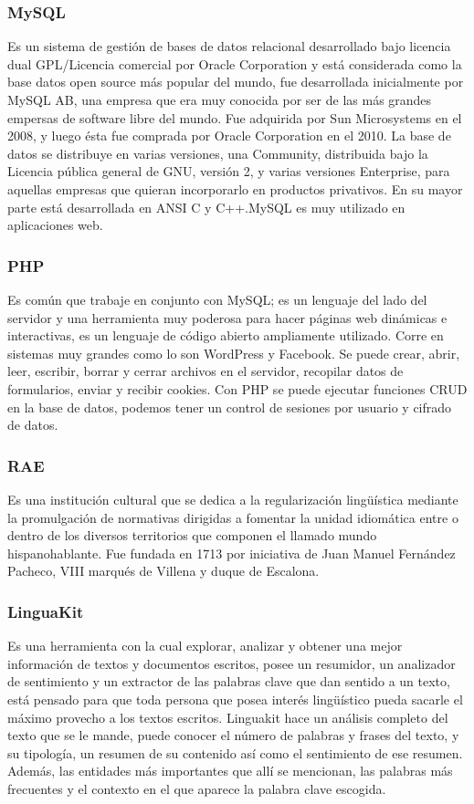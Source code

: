 \documentclass[a4paper,openright,11pt]{article}
\begin{document}
\subsubsection{MySQL}
Es un sistema de gestión de bases de datos relacional desarrollado bajo licencia dual GPL/Licencia comercial por Oracle Corporation y está considerada como la base datos open source más popular del mundo, fue desarrollada inicialmente por MySQL AB, una empresa que era muy conocida por ser de las más grandes empersas de software libre del mundo. Fue adquirida por Sun Microsystems en el 2008, y luego ésta fue comprada por Oracle Corporation en el 2010. La base de datos se distribuye en varias versiones, una Community, distribuida bajo la Licencia pública general de GNU, versión 2, y varias versiones Enterprise, para aquellas empresas que quieran incorporarlo en productos privativos. En su mayor parte está desarrollada en ANSI C y C++.MySQL es muy utilizado en aplicaciones web.

\subsubsection{PHP}
Es común que trabaje en conjunto con MySQL; es un lenguaje del lado del servidor y una herramienta muy poderosa para hacer páginas web dinámicas e interactivas, es un lenguaje de código abierto ampliamente utilizado. Corre en sistemas muy grandes como lo son WordPress y Facebook. Se puede crear, abrir, leer, escribir, borrar y cerrar archivos en el servidor, recopilar datos de formularios, enviar y recibir cookies. Con PHP se puede ejecutar funciones CRUD en la base de datos, podemos tener un control de sesiones por usuario y cifrado de datos.

\subsubsection{RAE}
Es una institución cultural que se dedica a la regularización lingüística mediante la promulgación de normativas dirigidas a fomentar la unidad idiomática entre o dentro de los diversos territorios que componen el llamado mundo hispanohablante. Fue fundada en 1713 por iniciativa de  Juan Manuel Fernández Pacheco, VIII marqués de Villena y duque de Escalona.

\subsubsection{LinguaKit}
Es una herramienta con la cual explorar, analizar y obtener una mejor información de textos y documentos escritos, posee un resumidor, un analizador de sentimiento y un extractor de las palabras clave que dan sentido a un texto, está pensado para que toda persona que posea interés lingüístico pueda sacarle el máximo provecho a los textos escritos. Linguakit hace un análisis completo del texto que se le mande, puede conocer el número de palabras y frases del texto, y su tipología, un resumen de su contenido así como el sentimiento de ese resumen. Además, las entidades más importantes que allí se mencionan, las palabras más frecuentes y el contexto en el que aparece la palabra clave escogida.
\end{document}
